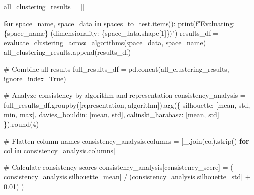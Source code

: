 \documentclass[
  letterpaper,
  DIV=11,
  numbers=noendperiod]{scrartcl}
\newenvironment{Shaded}{\begin{snugshade}}{\end{snugshade}}
\newcommand{\BuiltInTok}[1]{\textcolor[rgb]{0.00,0.23,0.31}{#1}}
\newcommand{\CommentTok}[1]{\textcolor[rgb]{0.37,0.37,0.37}{#1}}
\newcommand{\ControlFlowTok}[1]{\textcolor[rgb]{0.00,0.23,0.31}{\textbf{#1}}}
\newcommand{\DecValTok}[1]{\textcolor[rgb]{0.68,0.00,0.00}{#1}}
\newcommand{\FloatTok}[1]{\textcolor[rgb]{0.68,0.00,0.00}{#1}}
\newcommand{\KeywordTok}[1]{\textcolor[rgb]{0.00,0.23,0.31}{\textbf{#1}}}
\newcommand{\NormalTok}[1]{\textcolor[rgb]{0.00,0.23,0.31}{#1}}
\newcommand{\OperatorTok}[1]{\textcolor[rgb]{0.37,0.37,0.37}{#1}}
\newcommand{\SpecialCharTok}[1]{\textcolor[rgb]{0.37,0.37,0.37}{#1}}
\newcommand{\SpecialStringTok}[1]{\textcolor[rgb]{0.13,0.47,0.30}{#1}}
\newcommand{\StringTok}[1]{\textcolor[rgb]{0.13,0.47,0.30}{#1}}
\newcommand{\VariableTok}[1]{\textcolor[rgb]{0.07,0.07,0.07}{#1}}
\renewenvironment{Shaded}{%
  \begin{tcolorbox}[%
    enhanced,%
    colback=codebg,%
    colframe=codebg,%
    borderline west={3pt}{0pt}{sectionblue},%
    fontupper=\small\ttfamily,%
    boxrule=0pt,%
    arc=0pt,%
    boxsep=5pt,%
    left=2mm,%
    right=2mm,%
    top=2mm,%
    bottom=2mm%
  ]%
}{%
  \end{tcolorbox}%
}
\begin{document}
\begin{Shaded}
\begin{Highlighting}[]
\NormalTok{all\_clustering\_results }\OperatorTok{=}\NormalTok{ []}

\ControlFlowTok{for}\NormalTok{ space\_name, space\_data }\KeywordTok{in}\NormalTok{ spaces\_to\_test.items():}
    \BuiltInTok{print}\NormalTok{(}\SpecialStringTok{f"Evaluating: }\SpecialCharTok{\{}\NormalTok{space\_name}\SpecialCharTok{\}}\SpecialStringTok{ (dimensionality: }\SpecialCharTok{\{}\NormalTok{space\_data}\SpecialCharTok{.}\NormalTok{shape[}\DecValTok{1}\NormalTok{]}\SpecialCharTok{\}}\SpecialStringTok{)"}\NormalTok{)}
\NormalTok{    results\_df }\OperatorTok{=}\NormalTok{ evaluate\_clustering\_across\_algorithms(space\_data, space\_name)}
\NormalTok{    all\_clustering\_results.append(results\_df)}

\CommentTok{\# Combine all results}
\NormalTok{full\_results\_df }\OperatorTok{=}\NormalTok{ pd.concat(all\_clustering\_results, ignore\_index}\OperatorTok{=}\VariableTok{True}\NormalTok{)}

\CommentTok{\# Analyze consistency by algorithm and representation}
\NormalTok{consistency\_analysis }\OperatorTok{=}\NormalTok{ full\_results\_df.groupby([}\StringTok{\textquotesingle{}representation\textquotesingle{}}\NormalTok{, }\StringTok{\textquotesingle{}algorithm\textquotesingle{}}\NormalTok{]).agg(\{}
    \StringTok{\textquotesingle{}silhouette\textquotesingle{}}\NormalTok{: [}\StringTok{\textquotesingle{}mean\textquotesingle{}}\NormalTok{, }\StringTok{\textquotesingle{}std\textquotesingle{}}\NormalTok{, }\StringTok{\textquotesingle{}min\textquotesingle{}}\NormalTok{, }\StringTok{\textquotesingle{}max\textquotesingle{}}\NormalTok{],}
    \StringTok{\textquotesingle{}davies\_bouldin\textquotesingle{}}\NormalTok{: [}\StringTok{\textquotesingle{}mean\textquotesingle{}}\NormalTok{, }\StringTok{\textquotesingle{}std\textquotesingle{}}\NormalTok{],}
    \StringTok{\textquotesingle{}calinski\_harabasz\textquotesingle{}}\NormalTok{: [}\StringTok{\textquotesingle{}mean\textquotesingle{}}\NormalTok{, }\StringTok{\textquotesingle{}std\textquotesingle{}}\NormalTok{]}
\NormalTok{\}).}\BuiltInTok{round}\NormalTok{(}\DecValTok{4}\NormalTok{)}

\CommentTok{\# Flatten column names}
\NormalTok{consistency\_analysis.columns }\OperatorTok{=}\NormalTok{ [}\StringTok{\textquotesingle{}\_\textquotesingle{}}\NormalTok{.join(col).strip() }\ControlFlowTok{for}\NormalTok{ col }\KeywordTok{in}\NormalTok{ consistency\_analysis.columns]}

\CommentTok{\# Calculate consistency scores}
\NormalTok{consistency\_analysis[}\StringTok{\textquotesingle{}consistency\_score\textquotesingle{}}\NormalTok{] }\OperatorTok{=}\NormalTok{ (}
\NormalTok{    consistency\_analysis[}\StringTok{\textquotesingle{}silhouette\_mean\textquotesingle{}}\NormalTok{] }\OperatorTok{/}\NormalTok{ (consistency\_analysis[}\StringTok{\textquotesingle{}silhouette\_std\textquotesingle{}}\NormalTok{] }\OperatorTok{+} \FloatTok{0.01}\NormalTok{)}
\NormalTok{)}


\end{Highlighting}
\end{Shaded}
\end{document}
